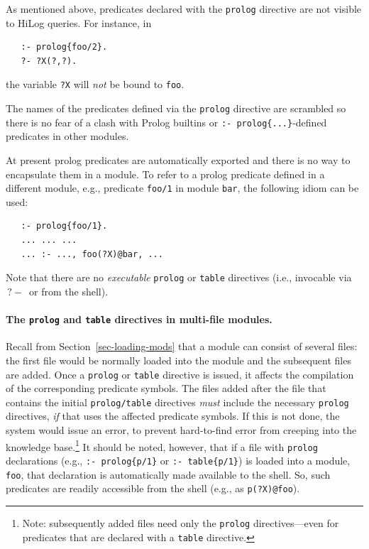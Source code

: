 \documentclass[11pt]{article}
\newcommand{\ERGO}{\mbox{\smaller{\ensuremath{\cal{E}}\smaller{{\sc{RGO}}}}}\xspace}
\newcommand{\FLSYSTEM}{\ERGO}
\newcommand{\query}{\mbox{$\, ?\! - \, $}}                  %
\begin{document}
As mentioned above, predicates declared with the \texttt{prolog} directive
are not visible to HiLog queries. For instance, in
\begin{verbatim}
   :- prolog{foo/2}.
   ?- ?X(?,?).
\end{verbatim}
the variable \texttt{?X} will \emph{not} be bound to \texttt{foo}.  

The names of the predicates defined via the \texttt{prolog} directive 
are scrambled so there is no fear of a clash with Prolog builtins or
\texttt{:- prolog\{...\}}-defined  predicates in other \FLSYSTEM modules.

At present prolog predicates are automatically exported and there is no way
to encapsulate them in a module. To refer to a prolog predicate defined in
a different module, e.g., predicate \texttt{foo/1} in module \texttt{bar},
the following idiom can be used:
\begin{verbatim}
   :- prolog{foo/1}.
   ... ... ...
   ... :- ..., foo(?X)@bar, ...
\end{verbatim}
Note that there are no \emph{executable}  \texttt{prolog} or \texttt{table}
directives (i.e., invocable via $\query$ or from the \FLSYSTEM shell).

\paragraph{The \texttt{prolog} and \texttt{table} directives in multi-file
  modules.}  
Recall from Section~\ref{sec-loading-mods} that a module can consist of
several files: the first file would be normally loaded into the module and
the subsequent files are added.
Once a \texttt{prolog} or \texttt{table} directive is issued, it affects
the compilation of the corresponding predicate symbols. The files added
after the file that contains the initial \texttt{prolog/table} directives
\emph{must} include
the necessary \texttt{prolog} directives, \emph{if} that uses the affected predicate symbols.
If this is not done, the system would issue an error, to prevent
hard-to-find error from creeping into the knowledge base.\footnote{
  Note: subsequently added files need only the \texttt{prolog}
  directives---even for predicates that are declared with a \texttt{table}
  directive. 
  }
It should be noted, however, that if a file with \texttt{prolog}
declarations (e.g., \texttt{:- prolog\{p/1\}} or \texttt{:- table\{p/1\}})  
is loaded into a module, \texttt{foo}, that declaration is automatically made
available to the \FLSYSTEM shell. So, such predicates are readily accessible
from the shell (e.g., as \texttt{p(?X)@foo}). 
\end{document}

